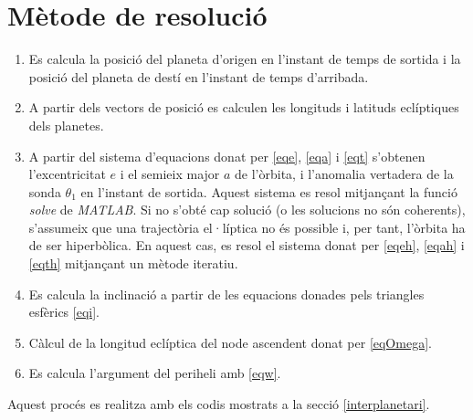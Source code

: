 \section{Mètode de resolució}
\begin{enumerate}
	\item Es calcula la posició del planeta d'origen en l'instant de temps de sortida i la posició del planeta de destí en l'instant de temps d'arribada.
	\item A partir dels vectors de posició es calculen les longituds i latituds eclíptiques dels planetes.
	\item A partir del sistema d'equacions donat per \ref{eqe}, \ref{eqa} i \ref{eqt} s'obtenen l'excentricitat $e$ i el semieix major $a$ de l'òrbita, i l'anomalia vertadera de la sonda $\theta_{1}$ en l'instant de sortida. Aquest sistema es resol mitjançant la funció \textit{solve} de \textit{MATLAB}. Si no s'obté cap solució (o les solucions no són coherents), s'assumeix que una trajectòria el·líptica no és possible i, per tant, l'òrbita ha de ser hiperbòlica. En aquest cas, es resol el sistema donat per \ref{eqeh}, \ref{eqah} i \ref{eqth} mitjançant un mètode iteratiu.
	\item Es calcula la inclinació a partir de les equacions donades pels triangles esfèrics \ref{eqi}.
	\item Càlcul de la longitud eclíptica del node ascendent donat per \ref{eqOmega}.
	\item Es calcula l'argument del periheli amb \ref{eqw}.
\end{enumerate}
Aquest procés es realitza amb els codis mostrats a la secció \ref{interplanetari}.
